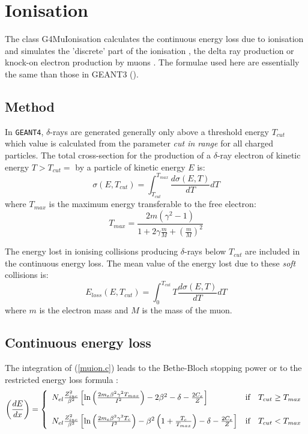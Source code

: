 \chapter[Ionisation]{Ionisation}
 

 The class G4MuIonisation calculates the continuous energy loss
  due to ionisation and
 simulates the 'discrete' part of the ionisation , 
the delta ray production or knock-on electron production by muons .
 The formulae used here
 are essentially the same than those in GEANT3 (\cite{hion.geant3}).

\section{Method}

In {\tt GEANT4}, $\delta$-rays are generated generally 
only above a threshold energy
$T_{cut}$ which value is calculated from the parameter {\em cut in range}
for all  charged particles. The total cross-section
for the production of a $\delta$-ray electron of kinetic
energy $T > T_{cut}=$ by a particle of kinetic energy $E$
is:
\begin{equation}
\label{muion.a}
\sigma (E,T_{cut}) = \int_{T_{cut}}^{T_{max}} \frac{d \sigma (E,T)}{dT} dT
\end{equation}
where $T_{max}$ is the maximum energy transferable to the free electron:
\begin{equation}
T_{max} =\frac{2m(\gamma^2 -1)}
      {1+2\gamma\frac{m}{M}+
      \left(\frac{m}{M} \right)^2 }
\end{equation}

The energy lost in
ionising collisions producing $\delta$-rays below ${T_{cut}}$
are included in the continuous energy loss. The mean value of the
energy lost due to these {\it soft} collisions is:
\begin{equation}
\label{muion.b}
E_{loss}(E,T_{cut}) = \int_{0}^{T_{cut}}
T \frac{d \sigma (E,T)} {dT} dT
\end{equation}
where $m$ is the electron mass and $M$ is the mass of the muon.

\section{Continuous energy loss}
The integration of (\ref{muion.c}) leads to the Bethe-Bloch
stopping power or to the restricted energy
loss formula \cite{hion.pdgb}:
\begin{equation}
\label{muion.c}
 \left(\frac{dE}{dx} \right) =
\left \{
\begin{array}{lcl}
 N_{el} \frac{ Z_{inc}^{2}}{\beta^{2}} \left [
\ln \left (
\frac{2 m_{e} \beta^{2} \gamma^{2} T_{max} }{I^{2}}
\right ) - 2 \beta^{2} -
\delta -
\frac{ 2 C_{e}}{Z} \right ]
\hfill & \mbox{if} & T_{cut} \geq T_{max} \\ [0.5cm]
 N_{el} \frac{ Z_{inc}^{2}}{ \beta^{2}} \left [
\ln \left (
\frac{ 2 m_{e} \beta^{2} \gamma^{2} T_{c} }{I^{2}}
\right ) -
\beta^{2} \left ( 1 + \frac{T_{c}}{T_{max}} \right )
 - \delta
-\frac{2 C_{e}}{Z} \right ] \hfill & \mbox{if} & T_{cut} < T_{max}
\end{array}
\right .
\end{equation}

